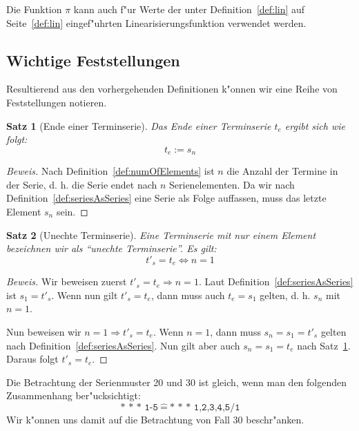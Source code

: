 \documentclass[a4paper]{article}
\numberwithin{equation}{section}
\newtheorem{thm}{Satz}
\begin{document}
Die Funktion $\pi$ kann auch f"ur Werte der unter Definition~\ref{def:lin} auf
Seite~\ref{def:lin} eingef"uhrten Linearisierungsfunktion verwendet werden.


%
%
\subsection{Wichtige Feststellungen}
Resultierend aus den vorhergehenden Definitionen k"onnen wir eine Reihe von
Feststellungen notieren.

\begin{thm}[Ende einer Terminserie]\label{thm:endOfSeries}
  Das Ende einer Terminserie $t_e$ ergibt sich wie folgt:
  \begin{equation}t_e := s_n\end{equation}
\end{thm}
\begin{proof}[Beweis]
  Nach Definition~\ref{def:numOfElements} ist $n$ die Anzahl der Termine in der
  Serie, d. h. die Serie endet nach $n$ Serienelementen. Da wir nach
  Definition~\ref{def:seriesAsSeries} eine Serie als Folge auf\mbox{}fassen,
  muss das letzte Element $s_n$ sein.
\end{proof}

\begin{thm}[Unechte Terminserie]
  Eine Terminserie mit nur einem Element bezeichnen wir als "`unechte
  Terminserie"'. Es gilt:
  \begin{equation}t'_s = t_e \Leftrightarrow n = 1\end{equation}
\end{thm}
\begin{proof}[Beweis]
  Wir beweisen zuerst $t'_s = t_e \Rightarrow n = 1$. Laut
  Definition~\ref{def:seriesAsSeries} ist $s_1 = t'_s$. Wenn nun gilt
  $t'_s = t_e$, dann muss auch $t_e = s_1$ gelten, d. h. $s_n$ mit $n = 1$.
  \par
  Nun beweisen wir $n = 1 \Rightarrow t'_s = t_e$. Wenn $n = 1$, dann muss
  $s_n = s_1 = t'_s$ gelten nach Definition~\ref{def:seriesAsSeries}. Nun gilt
  aber auch $s_n = s_1 = t_e$ nach Satz~\ref{thm:endOfSeries}. Daraus folgt
  $t'_s = t_e$.
\end{proof}

Die Betrachtung der Serienmuster 20 und 30 ist gleich, wenn man den folgenden
Zusammenhang ber"ucksichtigt:
\begin{equation}
  \label{eqn:20to30}\texttt{* * * 1-5}\ \hat{=}\ \texttt{* * * 1,2,3,4,5/1}
\end{equation}
Wir k"onnen uns damit auf die Betrachtung von Fall 30 beschr"anken.
\end{document}
